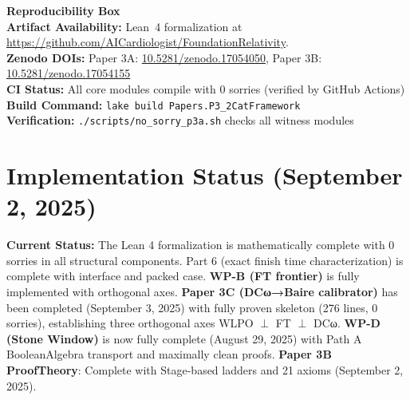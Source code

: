 \documentclass[11pt]{article}
\theoremstyle{definition}
\theoremstyle{remark}
\begin{document}
\begin{mdframed}[style=status]
\textbf{Reproducibility Box} \\[0.3em]
\textbf{Artifact Availability:} Lean~4 formalization at \url{https://github.com/AICardiologist/FoundationRelativity}.\\
\textbf{Zenodo DOIs:} Paper 3A: \href{https://doi.org/10.5281/zenodo.17054050}{10.5281/zenodo.17054050}, Paper 3B: \href{https://doi.org/10.5281/zenodo.17054155}{10.5281/zenodo.17054155}\\
\textbf{CI Status:} All core modules compile with 0 sorries (verified by GitHub Actions)\\
\textbf{Build Command:} \texttt{lake build Papers.P3\_2CatFramework}\\
\textbf{Verification:} \texttt{./scripts/no\_sorry\_p3a.sh} checks all witness modules
\end{mdframed}

\tableofcontents

\section{Implementation Status (September 2, 2025)}

\begin{mdframed}[style=status]
\textbf{Current Status:} The Lean 4 formalization is mathematically complete with 0 sorries in all structural components. Part 6 (exact finish time characterization) is complete with interface and packed case. \textbf{WP-B (FT frontier)} is fully implemented with orthogonal axes. \textbf{Paper 3C (DCω→Baire calibrator)} has been completed (September 3, 2025) with fully proven skeleton (276 lines, 0 sorries), establishing three orthogonal axes WLPO $\perp$ FT $\perp$ DCω. \textbf{WP-D (Stone Window)} is now fully complete (August 29, 2025) with Path A BooleanAlgebra transport and maximally clean proofs. \textbf{Paper 3B ProofTheory}: Complete with Stage-based ladders and 21 axioms (September 2, 2025).
\end{mdframed}
\end{document}

